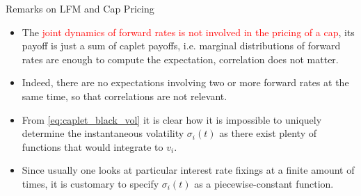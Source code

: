 \documentclass{beamer}
\begin{document}

\begin{frame}{Remarks on LFM and Cap Pricing}
\begin{itemize}
	\item<1-> The \textcolor{red}{joint dynamics of forward rates is not involved in the pricing of a cap}, its payoff is just a sum of caplet payoffs, i.e. marginal distributions of forward rates are enough to compute the expectation, correlation does not matter. 
	\item <2-> Indeed, there are no expectations involving two or more forward rates at the same time, so that correlations are not relevant.
	\item<3-> From \cref{eq:caplet_black_vol} it is clear how it is impossible to uniquely determine the instantaneous volatility $\sigma_i(t)$ as there exist plenty of functions that would integrate to $v_i$.
	\item<4-> Since usually one looks at particular interest rate fixings at a finite amount of times, it is customary to specify $\sigma_i(t)$ as a piecewise-constant function.
	\end{itemize}
\end{frame}
\end{document}
